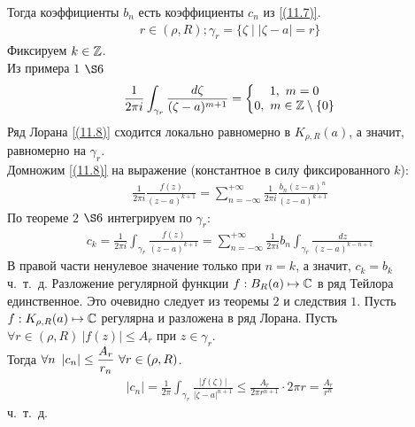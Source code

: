 Тогда коэффициенты $b_n$ есть коэффициенты $c_n$ из \eqref{(11.7)}.
\pr
\begin{align*}
  r \in (\rho, R); \gamma_r = \{\zeta \mid \left| \zeta - a \right| = r\}
\end{align*}
Фиксируем $k \in \mathbb{Z}$.
\\
Из примера $1$ $\S6$
\begin{align*}
  \frac{1}{2 \pi i} \int_{\gamma_r}\frac{d\zeta}{(\zeta - a)^{m+1}} = \left\{ \begin{matrix}
          1, \ m = 0 \\
          0, \ m \in \mathbb{Z} \setminus\{0\}
      \end{matrix} \right.
\end{align*}
Ряд Лорана \eqref{(11.8)} сходится локально равномерно в $K_{\rho,R}(a)$,
а значит, равномерно на $\gamma_r$.
\\
Домножим \eqref{(11.8)} на выражение (константное в силу фиксированного
$k$):
\begin{align*}
  \frac{1}{2\pi i}\frac{f(z)}{(z-a)^{k+1}} = \sum_{n = -\infty}^{+\infty} \frac{1}{2 \pi i}\frac{b_n(z-a)^n}{(z-a)^{k+1}}
\end{align*}
По теореме $2$ $\S 6$ интегрируем по $\gamma_r$:
\begin{align*}
  c_k = \frac{1}{2 \pi i} \int_{\gamma_r}\frac{f(z)}{(z - a)^{k+1}} = \sum_{n = -\infty}^{+\infty} \frac{1}{2\pi i}b_n \int_{\gamma_r}\frac{dz}{(z-a)^{k-n+1}}
\end{align*}
В правой части ненулевое значение только при $n=k$, а значит, $c_k = b_k$
\\
ч.~т.~д.
\corollary
Разложение регулярной функции $f: B_R(a) \mapsto \mathbb{C}$ в ряд Тейлора
единственное.
\pr
Это очевидно следует из теоремы $2$ и следствия $1$.
\corollary
Пусть $f:K_{\rho,R}(a) \mapsto \mathbb{C}$ регулярна и разложена в ряд Лорана. Пусть
$\forall r \in (\rho, R) \ \left| f(z) \right|\leq A_r$ при $z \in \gamma_r$.
\\
Тогда $\forall n \ \left| c_n \right| \leq \displaystyle \frac{A_r}{r_n} \ \forall r \in
(\rho, R)$.
\pr
\begin{align*}
  \left| c_n \right| = \frac{1}{2 \pi} \int_{\gamma_r}\frac{\left| f(\zeta) \right|}{\left| \zeta - a \right|^{n+1}} \leq \frac{A_r}{2 \pi r^{n+1}} \cdot 2 \pi r = \frac{A_r}{r^n}
\end{align*}
ч.~т.~д.
